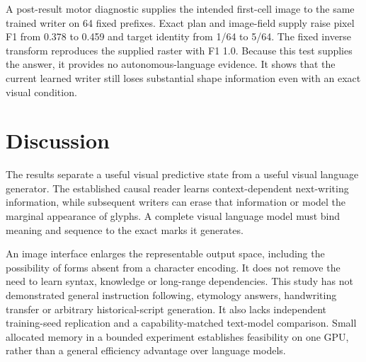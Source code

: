 A post-result motor diagnostic supplies the intended first-cell image to the
same trained writer on 64 fixed prefixes. Exact plan and image-field supply
raise pixel F1 from 0.378 to 0.459 and target identity from 1/64 to 5/64.
The fixed inverse transform reproduces the supplied raster with F1 1.0.
Because this test supplies the answer, it provides no autonomous-language
evidence. It shows that the current learned writer still loses substantial
shape information even with an exact visual condition.


\section*{Discussion}
The results separate a useful visual predictive state from a useful visual
language generator. The established causal reader learns context-dependent
next-writing information, while subsequent writers can erase that information
or model the marginal appearance of glyphs. A complete visual language model
must bind meaning and sequence to the exact marks it generates.

An image interface enlarges the representable output space, including the
possibility of forms absent from a character encoding. It does not remove the
need to learn syntax, knowledge or long-range dependencies. This study has not
demonstrated general instruction following, etymology answers, handwriting
transfer or arbitrary historical-script generation. It also lacks independent
training-seed replication and a capability-matched text-model comparison.
Small allocated memory in a bounded experiment establishes feasibility on one
GPU, rather than a general efficiency advantage over language models.

